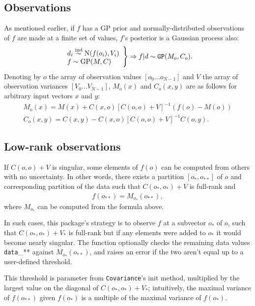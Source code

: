 \documentclass{manual}
\begin{document}
\subsection{Observations}
As mentioned earlier, if $f$ has a GP prior and normally-distributed observations of $f$ are made at a finite set of values, $f$'s posterior is a Gaussian process also:
\begin{eqnarray*}
    \left.\begin{array}{l}
        d_i \stackrel{\tiny{\textup{ind}}}{\sim} \textup{N}(f(o_i), V_i)\\
        f \sim \textup{GP}(M,C)
    \end{array}\right\}\Rightarrow f|d \sim \texttt{GP}(M_o, C_o).    
\end{eqnarray*}
Denoting by $o$ the array of observation values $[o_0\ldots o_{N-1}]$ and $V$ the array of observation variances $[V_0\ldots V_{N-1}]$, $M_o(x)$ and $C_o(x,y)$ are as follows for arbitrary input vectors $x$ and $y$:
\begin{eqnarray*}
    M_o(x) = M(x) + C(x,o)[C(o,o) + V]^{-1}(f(o)-M(o))\\
    C_o(x,y) = C(x,y) - C(x,o)[C(o,o) + V]^{-1}C(o,y).
\end{eqnarray*}

\subsection{Low-rank observations} 

If $C(o,o)+V$ is singular, some elements of $f(o)$ can be computed from others with no uncertainty. In other words, there exists a partition $[o_*, o_{**}]$ of $o$ and corresponding partition of the data such that $C(o_*,o_*)+V$ is full-rank and
\begin{eqnarray*}
    f(o_{**}) = M_{o_*}(o_{**}),
\end{eqnarray*}
where $M_{o_*}$ can be computed from the formula above.

In such cases, this package's strategy is to observe $f$ at a subvector $o_*$ of $o$, such that $C(o_*,o_*)+V_*$ is full-rank but if any elements were added to $o_*$ it would become nearly singular. The function  optionally checks the remaining data values \texttt{data}_{**} against $M_{o_*}(o_{**})$, and raises an error if the two aren't equal up to a user-defined threshold. 

This threshold is parameter  from \texttt{Covariance}'s init method, multiplied by the largest value on the diagonal of $C(o_*,o_*)+V_*$; intuitively, the maximal variance of $f(o_{**})$ given $f(o_*)$ is a multiple of the maximal variance of $f(o_*)$.
\end{document}
